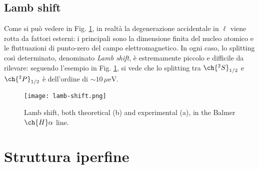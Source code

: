 \subsection{Lamb shift}

Come si può vedere in Fig. \ref{img:lamb}, in realtà la degenerazione accidentale in $ \ell $ viene rotta da fattori esterni: i principali sono la dimensione finita del nucleo atomico e le fluttuazioni di punto-zero del campo elettromagnetico. In ogni caso, lo splitting così determinato, denominato \textit{Lamb shift}, è estremamente piccolo e difficile da rilevare: seguendo l'esempio in Fig. \ref{img:lamb}, si vede che lo splitting tra $ \ch{^2S}_{1/2} $ e $ \ch{^2P}_{1/2} $ è dell'ordine di $ \sim 10\,\mu\text{eV} $.

\begin{figure}
	\centering
	\texttt{[image: lamb-shift.png]}
	\caption{Lamb shift, both theoretical (b) and experimental (a), in the Balmer $ \ch{H}\alpha $ line.}
	\label{img:lamb}
\end{figure}

\section{Struttura iperfine}

